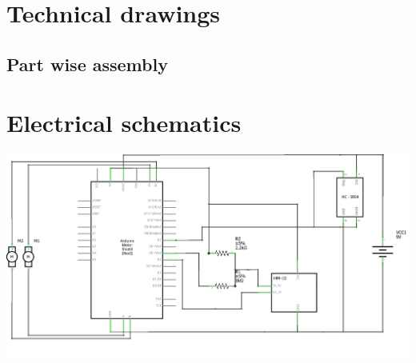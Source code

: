 \section{Technical drawings}

\subsection{Part wise assembly}

\section{Electrical schematics}
\includegraphics[scale = 1.0]{Appendix/Amandatory_exam_schem.png}